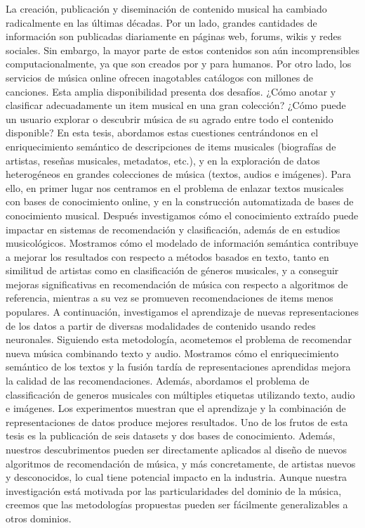 La creación, publicación y diseminación de contenido musical ha cambiado radicalmente en las últimas décadas. Por un lado, grandes cantidades de información son publicadas diariamente en páginas web, forums, wikis y redes sociales. Sin embargo, la mayor parte de estos contenidos son aún incomprensibles computacionalmente, ya que son creados por y para humanos. Por otro lado, los servicios de música online ofrecen inagotables catálogos con millones de canciones. Esta amplia disponibilidad presenta dos desafíos. ¿Cómo anotar y clasificar adecuadamente un item musical en una gran colección? ¿Cómo puede un usuario explorar o descubrir música de su agrado entre todo el contenido disponible? En esta tesis, abordamos estas cuestiones centrándonos en el enriquecimiento semántico de descripciones de items musicales (biografías de artistas, reseñas musicales, metadatos, etc.), y en la exploración de datos heterogéneos en grandes colecciones de música (textos, audios e imágenes). Para ello, en primer lugar nos centramos en el problema de enlazar textos musicales con bases de conocimiento online, y en la construcción automatizada de bases de conocimiento musical. Después investigamos cómo el conocimiento extraído puede impactar en sistemas de recomendación y clasificación, además de en estudios musicológicos. Mostramos cómo el modelado de información semántica contribuye a mejorar los resultados con respecto a métodos basados en texto, tanto en similitud de artistas como en clasificación de géneros musicales, y a conseguir mejoras significativas en recomendación de música con respecto a algoritmos de referencia, mientras a su vez se promueven recomendaciones de items menos populares. A continuación, investigamos el aprendizaje de nuevas representaciones de los datos a partir de diversas modalidades de contenido usando redes neuronales. Siguiendo esta metodología, acometemos el problema de recomendar nueva música combinando texto y audio. Mostramos cómo el enriquecimiento semántico de los textos y la fusión tardía de representaciones aprendidas mejora la calidad de las recomendaciones. Además, abordamos el problema de classificación de generos musicales con múltiples etiquetas utilizando texto, audio e imágenes. Los experimentos muestran que el aprendizaje y la combinación de representaciones de datos produce mejores resultados. Uno de los frutos de esta tesis es la publicación de seis datasets y dos bases de conocimiento. Además, nuestros descubrimentos pueden ser directamente aplicados al diseño de nuevos algoritmos de recomendación de música, y más concretamente, de artistas nuevos y desconocidos, lo cual tiene potencial impacto en la industria. Aunque nuestra investigación está motivada por las particularidades del dominio de la música, creemos que las metodologías propuestas pueden ser fácilmente generalizables a otros dominios.